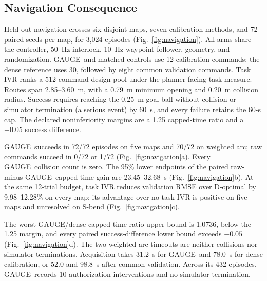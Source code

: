 \documentclass[letterpaper,10pt,conference]{ieeeconf}
\newcommand{\method}{GAUGE}
\begin{document}
\subsection{Navigation Consequence}

Held-out navigation crosses six disjoint maps, seven calibration methods, and
72 paired seeds per map, for 3,024 episodes (Fig.~\ref{fig:navigation}). All arms
share the controller, 50~Hz interlock, 10~Hz waypoint follower, geometry, and
randomization. \method\ and matched controls use 12 calibration commands; the
dense reference uses 30, followed by eight common validation commands. Task IVR
ranks a 512-command design pool under the planner-facing task measure. Routes
span 2.85--3.60~m, with a 0.79~m minimum opening and 0.20~m collision radius.
Success requires reaching the 0.25~m goal ball without collision or simulator
termination (a serious event) by 60~s, and every failure retains the 60-s cap.
The declared
noninferiority margins are a 1.25 capped-time ratio and a $-0.05$ success
difference.

\method\ succeeds in 72/72 episodes on five maps and 70/72 on weighted arc;
raw commands succeed in 0/72 or 1/72 (Fig.~\ref{fig:navigation}a). Every
\method\ collision count is zero. The 95\% lower endpoints of the paired
raw-minus-\method\ capped-time gain are 23.45--32.68~s
(Fig.~\ref{fig:navigation}b). At the same 12-trial budget, task IVR reduces
validation RMSE over D-optimal by 9.98--12.28\% on every map; its advantage over
no-task IVR is positive on five maps and unresolved on S-bend
(Fig.~\ref{fig:navigation}c).

The worst \method/dense capped-time ratio upper bound is 1.0736, below the 1.25
margin, and every paired success-difference lower bound exceeds $-0.05$
(Fig.~\ref{fig:navigation}d). The two weighted-arc timeouts are neither
collisions nor simulator terminations. Acquisition takes 31.2~s for \method\ and 78.0~s
for dense calibration, or 52.0 and 98.8~s after common validation. Across its
432 episodes, \method\ records 10 authorization interventions and no simulator
termination.
\end{document}

